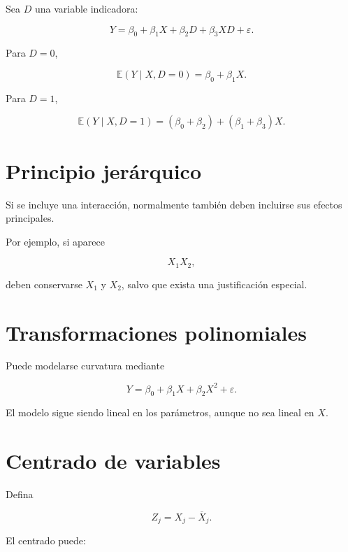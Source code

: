 \documentclass[
  spanish,
  10.5pt,
  letterpaper,
  DIV=11,
  numbers=noendperiod,
  oneside,
  open=any]{scrreprt}
\theoremstyle{definition}
\theoremstyle{definition}
\theoremstyle{plain}
\theoremstyle{remark}
\begin{document}

Sea \(D\) una variable indicadora:

\[
Y
=
\beta_0
+
\beta_1X
+
\beta_2D
+
\beta_3XD
+
\varepsilon.
\]

Para \(D=0\),

\[
\mathbb{E}(Y\mid X,D=0)
=
\beta_0+\beta_1X.
\]

Para \(D=1\),

\[
\mathbb{E}(Y\mid X,D=1)
=
(\beta_0+\beta_2)
+
(\beta_1+\beta_3)X.
\]

\section*{Principio jerárquico}\label{principio-jeruxe1rquico}


Si se incluye una interacción, normalmente también deben incluirse sus
efectos principales.

Por ejemplo, si aparece

\[
X_1X_2,
\]

deben conservarse \(X_1\) y \(X_2\), salvo que exista una justificación
especial.

\section*{Transformaciones
polinomiales}\label{transformaciones-polinomiales}


Puede modelarse curvatura mediante

\[
Y
=
\beta_0
+
\beta_1X
+
\beta_2X^2
+
\varepsilon.
\]

El modelo sigue siendo lineal en los parámetros, aunque no sea lineal en
\(X\).

\section*{Centrado de variables}\label{centrado-de-variables}


Defina

\[
Z_j
=
X_j-\overline{X}_j.
\]

El centrado puede:
\end{document}
